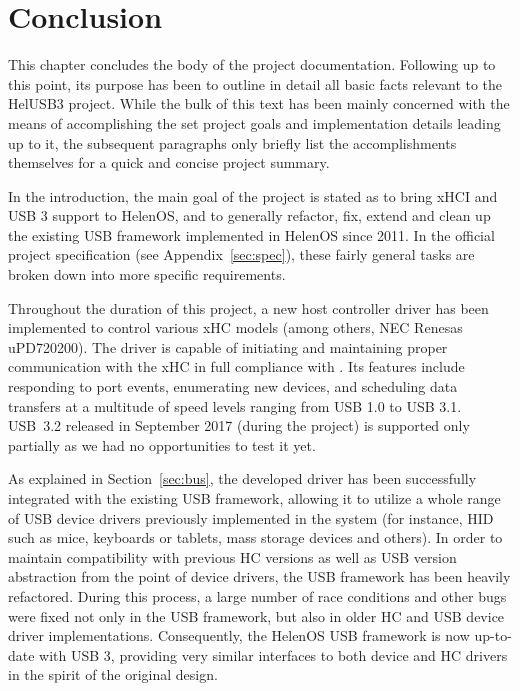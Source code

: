 \chapter*{Conclusion}

This chapter concludes the body of the project documentation. Following up to
this point, its purpose has been to outline in detail all basic facts relevant
to the HelUSB3 project. While the bulk of this text has been mainly concerned
with the means of accomplishing the set project goals and implementation details
leading up to it, the subsequent paragraphs only briefly list the
accomplishments themselves for a quick and concise project summary.

In the introduction, the main goal of the project is stated as to bring xHCI and
USB 3 support to HelenOS, and to generally refactor, fix, extend and clean up the
existing USB framework implemented in HelenOS since 2011. In the official
project specification (see Appendix~\ref{sec:spec}), these fairly general tasks
are broken down into more specific requirements.

Throughout the duration of this project, a new host controller driver has been
implemented to control various xHC models (among others, NEC Renesas
uPD720200). The driver is capable of initiating and maintaining proper
communication with the xHC in full compliance with \cite{xhci}. Its features
include responding to port events, enumerating new devices, and scheduling data
transfers at a multitude of speed levels ranging from USB 1.0 to USB 3.1.
USB~3.2 released in September 2017 (during the project) is supported only
partially as we had no opportunities to test it yet.

As explained in Section~\ref{sec:bus}, the developed driver has been successfully
integrated with the existing USB framework, allowing it to utilize a whole range
of USB device drivers previously implemented in the system (for instance, HID
such as mice, keyboards or tablets, mass storage devices and others). In order
to maintain compatibility with previous HC versions as well as USB version
abstraction from the point of device drivers, the USB framework has been heavily
refactored. During this process, a large number of race conditions and other
bugs were fixed not only in the USB framework, but also in older HC and USB
device driver implementations. Consequently, the HelenOS USB framework is now
up-to-date with USB 3, providing very similar interfaces to both device and HC
drivers in the spirit of the original design.

